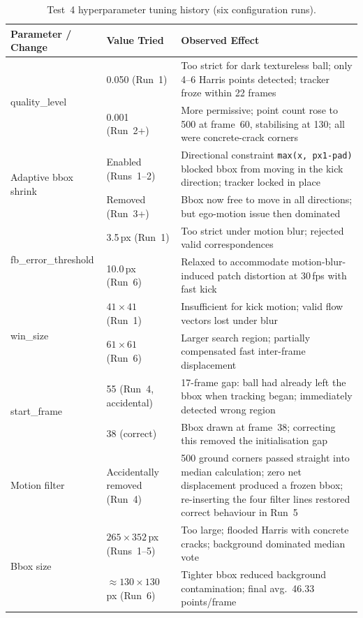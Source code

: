 \documentclass[12pt,a4paper]{article}
\begin{document}
\begin{table}[H]
\centering\small
\caption{Test~4 hyperparameter tuning history (six configuration runs).}
\label{tab:hyper4}
\begin{tabularx}{\textwidth}{llX}
\toprule
\rowcolor{accentteal!20}
\textbf{Parameter / Change} & \textbf{Value Tried} & \textbf{Observed Effect} \\
\midrule
\multirow{2}{*}{quality\_level}
 & 0.050 (Run~1) & Too strict for dark textureless ball; only 4--6 Harris points detected; tracker froze within 22 frames \\
 & 0.001 (Run~2+) & More permissive; point count rose to 500 at frame~60, stabilising at 130; all were concrete-crack corners \\
\midrule
\multirow{2}{*}{Adaptive bbox shrink}
 & Enabled (Runs~1--2) & Directional constraint \texttt{max(x, px1-pad)} blocked bbox from moving in the kick direction; tracker locked in place \\
 & Removed (Run~3+) & Bbox now free to move in all directions; but ego-motion issue then dominated \\
\midrule
\multirow{2}{*}{fb\_error\_threshold}
 & 3.5\,px (Run~1) & Too strict under motion blur; rejected valid correspondences \\
 & 10.0\,px (Run~6) & Relaxed to accommodate motion-blur-induced patch distortion at 30\,fps with fast kick \\
\midrule
\multirow{2}{*}{win\_size}
 & $41\times41$ (Run~1) & Insufficient for kick motion; valid flow vectors lost under blur \\
 & $61\times61$ (Run~6) & Larger search region; partially compensated fast inter-frame displacement \\
\midrule
\multirow{2}{*}{start\_frame}
 & 55 (Run~4, accidental) & 17-frame gap: ball had already left the bbox when tracking began; immediately detected wrong region \\
 & 38 (correct) & Bbox drawn at frame~38; correcting this removed the initialisation gap \\
\midrule
Motion filter & Accidentally removed (Run~4) & 500 ground corners passed straight into median calculation; zero net displacement produced a frozen bbox; re-inserting the four filter lines restored correct behaviour in Run~5 \\
\midrule
\multirow{2}{*}{Bbox size}
 & $265\times352$\,px (Runs~1--5) & Too large; flooded Harris with concrete cracks; background dominated median vote \\
 & $\approx130\times130$\,px (Run~6) & Tighter bbox reduced background contamination; final avg.\ 46.33 points/frame \\
\bottomrule
\end{tabularx}
\end{table}
\end{document}
